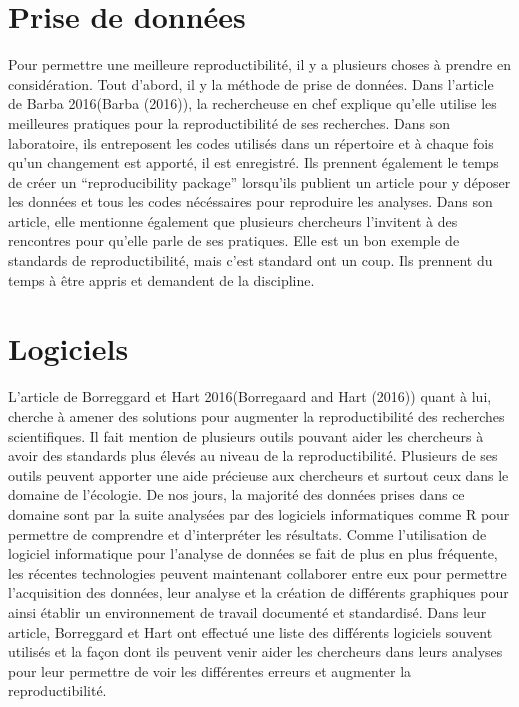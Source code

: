 \documentclass[
]{article}
\begin{document}
\hypertarget{prise-de-donnuxe9es}{%
\section{Prise de données}\label{prise-de-donnuxe9es}}

Pour permettre une meilleure reproductibilité, il y a plusieurs choses à
prendre en considération. Tout d'abord, il y la méthode de prise de
données. Dans l'article de Barba 2016(Barba (2016)), la rechercheuse en
chef explique qu'elle utilise les meilleures pratiques pour la
reproductibilité de ses recherches. Dans son laboratoire, ils
entreposent les codes utilisés dans un répertoire et à chaque fois qu'un
changement est apporté, il est enregistré. Ils prennent également le
temps de créer un ``reproducibility package'' lorsqu'ils publient un
article pour y déposer les données et tous les codes nécéssaires pour
reproduire les analyses. Dans son article, elle mentionne également que
plusieurs chercheurs l'invitent à des rencontres pour qu'elle parle de
ses pratiques. Elle est un bon exemple de standards de reproductibilité,
mais c'est standard ont un coup. Ils prennent du temps à être appris et
demandent de la discipline.

\hypertarget{logiciels}{%
\section{Logiciels}\label{logiciels}}

L'article de Borreggard et Hart 2016(Borregaard and Hart (2016)) quant à
lui, cherche à amener des solutions pour augmenter la reproductibilité
des recherches scientifiques. Il fait mention de plusieurs outils
pouvant aider les chercheurs à avoir des standards plus élevés au niveau
de la reproductibilité. Plusieurs de ses outils peuvent apporter une
aide précieuse aux chercheurs et surtout ceux dans le domaine de
l'écologie. De nos jours, la majorité des données prises dans ce domaine
sont par la suite analysées par des logiciels informatiques comme R pour
permettre de comprendre et d'interpréter les résultats. Comme
l'utilisation de logiciel informatique pour l'analyse de données se fait
de plus en plus fréquente, les récentes technologies peuvent maintenant
collaborer entre eux pour permettre l'acquisition des données, leur
analyse et la création de différents graphiques pour ainsi établir un
environnement de travail documenté et standardisé. Dans leur article,
Borreggard et Hart ont effectué une liste des différents logiciels
souvent utilisés et la façon dont ils peuvent venir aider les chercheurs
dans leurs analyses pour leur permettre de voir les différentes erreurs
et augmenter la reproductibilité.
\end{document}
